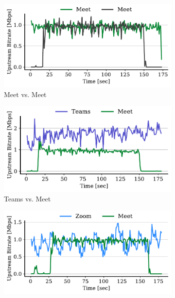 \begin{figure}[]
\centering
\begin{subfigure}[t]{.4\textwidth}
    \centering
    \includegraphics[width=1\textwidth]{figures/appendix/meet_meet_3_ul_r2.pdf}
    \caption{Meet vs. Meet}
    \label{subfig:meet-meet-3}
\end{subfigure}\hfill
\begin{subfigure}[t]{.4\textwidth}
    \centering
    \includegraphics[width=1\textwidth]{figures/appendix/teams_meet_3_ul_r3.pdf}
    \caption{Teams vs. Meet}
    \label{subfig:teams-meet-3}
\end{subfigure}
\begin{subfigure}[t]{.4\textwidth}
    \centering
    \includegraphics[width=1\textwidth]{figures/appendix/zoom_meet_3_ul_r2.pdf}

\end{subfigure}
\end{figure}
